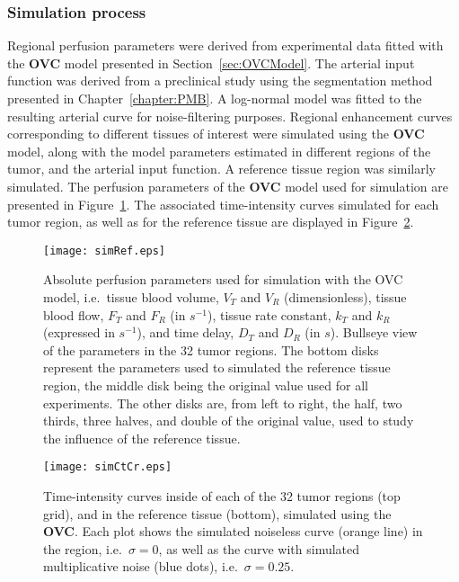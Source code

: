 \subsubsection{Simulation process}
Regional perfusion parameters were derived from experimental data fitted with the \textbf{OVC} model presented in Section~\ref{sec:OVCModel}.
The arterial input function was derived from a preclinical study using the segmentation method presented in Chapter~\ref{chapter:PMB}.
A log-normal model was fitted to the resulting arterial curve for noise-filtering purposes. 
Regional enhancement curves corresponding to different tissues of interest were simulated using the \textbf{OVC} model, along with the model parameters estimated in different regions of the tumor, and the arterial input function.
A reference tissue region was similarly simulated.
The perfusion parameters of the \textbf{OVC} model used for simulation are presented in Figure~\ref{fig:simRef}.
The associated time-intensity curves simulated for each tumor region, as well as for the reference tissue are displayed in Figure~\ref{fig:simCtCr}.

\begin{figure}[bh]
\texttt{[image: simRef.eps]}
\caption{Absolute perfusion parameters used for simulation with the OVC model, i.e.~tissue blood volume, $V_T$ and $V_R$ (dimensionless), tissue blood flow, $F_T$ and $F_R$ (in $s^{-1}$), tissue rate constant, $k_T$ and $k_R$ (expressed in $s^{-1}$), and time delay, $D_T$ and $D_R$ (in $s$). Bullseye view of the parameters in the 32 tumor regions. The bottom disks represent the parameters used to simulated the reference tissue region, the middle disk being the original value used for all experiments. The other disks are, from left to right, the half, two thirds, three halves, and double of the original value, used to study the influence of the reference tissue.}
\label{fig:simRef}
\end{figure}

\begin{figure}
\texttt{[image: simCtCr.eps]}
\caption{Time-intensity curves inside of each of the 32 tumor regions (top grid), and in the reference tissue (bottom), simulated using the \textbf{OVC}. Each plot shows the simulated noiseless curve (orange line) in the region, i.e.~$\sigma = 0$, as well as the curve with simulated multiplicative noise (blue dots), i.e.~$\sigma = 0.25$.}
\label{fig:simCtCr}
\end{figure}
\FloatBarrier

